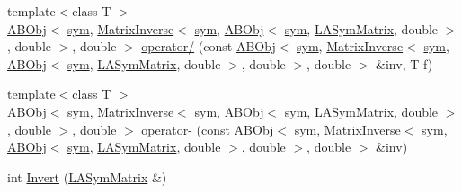 \begin{DoxyCompactItemize}
\item 
{\footnotesize template$<$class T $>$ }\\\mbox{\hyperlink{classROOT_1_1Minuit2_1_1ABObj}{A\+B\+Obj}}$<$ \mbox{\hyperlink{classROOT_1_1Minuit2_1_1sym}{sym}}, \mbox{\hyperlink{classROOT_1_1Minuit2_1_1MatrixInverse}{Matrix\+Inverse}}$<$ \mbox{\hyperlink{classROOT_1_1Minuit2_1_1sym}{sym}}, \mbox{\hyperlink{classROOT_1_1Minuit2_1_1ABObj}{A\+B\+Obj}}$<$ \mbox{\hyperlink{classROOT_1_1Minuit2_1_1sym}{sym}}, \mbox{\hyperlink{classROOT_1_1Minuit2_1_1LASymMatrix}{L\+A\+Sym\+Matrix}}, double $>$, double $>$, double $>$ \mbox{\hyperlink{namespaceROOT_1_1Minuit2_afaff6ec8d1115025bd92259424674647}{operator/}} (const \mbox{\hyperlink{classROOT_1_1Minuit2_1_1ABObj}{A\+B\+Obj}}$<$ \mbox{\hyperlink{classROOT_1_1Minuit2_1_1sym}{sym}}, \mbox{\hyperlink{classROOT_1_1Minuit2_1_1MatrixInverse}{Matrix\+Inverse}}$<$ \mbox{\hyperlink{classROOT_1_1Minuit2_1_1sym}{sym}}, \mbox{\hyperlink{classROOT_1_1Minuit2_1_1ABObj}{A\+B\+Obj}}$<$ \mbox{\hyperlink{classROOT_1_1Minuit2_1_1sym}{sym}}, \mbox{\hyperlink{classROOT_1_1Minuit2_1_1LASymMatrix}{L\+A\+Sym\+Matrix}}, double $>$, double $>$, double $>$ \&inv, T f)
\item 
{\footnotesize template$<$class T $>$ }\\\mbox{\hyperlink{classROOT_1_1Minuit2_1_1ABObj}{A\+B\+Obj}}$<$ \mbox{\hyperlink{classROOT_1_1Minuit2_1_1sym}{sym}}, \mbox{\hyperlink{classROOT_1_1Minuit2_1_1MatrixInverse}{Matrix\+Inverse}}$<$ \mbox{\hyperlink{classROOT_1_1Minuit2_1_1sym}{sym}}, \mbox{\hyperlink{classROOT_1_1Minuit2_1_1ABObj}{A\+B\+Obj}}$<$ \mbox{\hyperlink{classROOT_1_1Minuit2_1_1sym}{sym}}, \mbox{\hyperlink{classROOT_1_1Minuit2_1_1LASymMatrix}{L\+A\+Sym\+Matrix}}, double $>$, double $>$, double $>$ \mbox{\hyperlink{namespaceROOT_1_1Minuit2_ad2bd6cb40eae74a6e46d532060e43c10}{operator-\/}} (const \mbox{\hyperlink{classROOT_1_1Minuit2_1_1ABObj}{A\+B\+Obj}}$<$ \mbox{\hyperlink{classROOT_1_1Minuit2_1_1sym}{sym}}, \mbox{\hyperlink{classROOT_1_1Minuit2_1_1MatrixInverse}{Matrix\+Inverse}}$<$ \mbox{\hyperlink{classROOT_1_1Minuit2_1_1sym}{sym}}, \mbox{\hyperlink{classROOT_1_1Minuit2_1_1ABObj}{A\+B\+Obj}}$<$ \mbox{\hyperlink{classROOT_1_1Minuit2_1_1sym}{sym}}, \mbox{\hyperlink{classROOT_1_1Minuit2_1_1LASymMatrix}{L\+A\+Sym\+Matrix}}, double $>$, double $>$, double $>$ \&inv)
\item 
int \mbox{\hyperlink{namespaceROOT_1_1Minuit2_a3d7791001fe4298059c858771fba35db}{Invert}} (\mbox{\hyperlink{classROOT_1_1Minuit2_1_1LASymMatrix}{L\+A\+Sym\+Matrix}} \&)
\item 

\end{DoxyCompactItemize}
